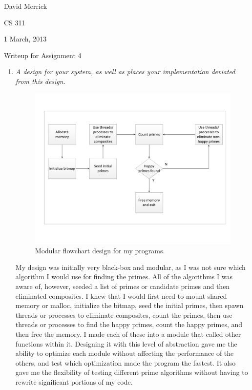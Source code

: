 \documentclass[letterpaper,10pt,titlepage]{article}
\begin{document}
David Merrick

CS 311

1 March, 2013

\begin{center}
{\LARGE Writeup for Assignment 4}
\end{center}

\begin{enumerate}
\item \emph{A design for your system, as well as places your implementation deviated from this design.}
\begin{figure}[htp]
  \begin{center}
  \includegraphics[width=8in]{design_flowchart}
  \end{center}
  \caption{Modular flowchart design for my programs.}
\end{figure}

My design was initially very black-box and modular, as I was not sure which algorithm I would use for finding the primes. All of the algorithms I was aware of, however, seeded a list of primes or candidate primes and then eliminated composites. I knew that I would first need to mount shared memory or malloc, initialize the bitmap, seed the initial primes, then spawn threads or processes to eliminate composites, count the primes, then use threads or processes to find the happy primes, count the happy primes, and then free the memory. I made each of these into a module that called other functions within it. Designing it with this level of abstraction gave me the ability to optimize each module without affecting the performance of the others, and test which optimization made the program the fastest. It also gave me the flexibility of testing different prime algorithms without having to rewrite significant portions of my code.


\end{enumerate}
\end{document}
